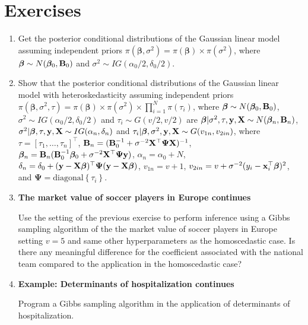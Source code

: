 \section{Exercises}\label{sec612}

\begin{enumerate}
	\item Get the posterior conditional distributions of the Gaussian linear model assuming independent priors $\pi(\bm{\beta},\sigma^2)=\pi(\bm{\beta})\times\pi(\sigma^2)$, where $\bm{\beta} \sim N(\bm{\beta}_0, {\bf{B}}_0)$ and $\sigma^2 \sim IG(\alpha_0/2, \delta_0/2)$.
	
	\item Show that the posterior conditional distributions of the Gaussian linear model with heteroskedasticity assuming independent priors $\pi(\bm{\beta},\sigma^2,\tau)=\pi(\bm{\beta})\times\pi(\sigma^2)\times\prod_{i=1}^N\pi(\tau_i)$, where $\bm{\beta} \sim N(\bm{\beta}_0, {\bf{B}}_0)$, $\sigma^2 \sim IG(\alpha_0/2, \delta_0/2)$ and $\tau_i\sim G(v/2,v/2)$ are $\bm{\beta}|\sigma^2,\tau,{\bf{y}},{\bf{X}}\sim N(\bm{\beta}_n,{\bf{B}}_n)$, $\sigma^2|\bm{\beta},\tau,{\bf{y}},{\bf{X}}\sim IG(\alpha_n,\delta_n)$ and $\tau_i|\bm{\beta},\sigma^2,{\bf{y}},{\bf{X}}\sim G(v_{1n},v_{2in})$, where $\tau=[\tau_1,\dots,\tau_n]^{\top}$, ${\bf{B}}_n=({\bf{B}}_0^{-1}+\sigma^{-2}{\bf{X}}^{\top}\bm{\Psi}{\bf{X}})^{-1}$, $\bm{\beta}_n={\bf{B}}_n({\bf{B}}_0^{-1}\bm{\beta}_0+\sigma^{-2}{\bf{X}}^{\top}\bm{\Psi}{\bf{y}})$, $\alpha_n=\alpha_0+N$, $\delta_n=\delta_0+({\bf{y}}-{\bf{X}}\bm{\beta})^{\top}\bm{\Psi}({\bf{y}}-{\bf{X}}\bm{\beta})$, $v_{1n}=v+1$, $v_{2in}=v+\sigma^{-2}(y_i-{\bf{x}}_i^{\top}\bm{\beta})^2$, and $\bm{\Psi}=\text{diagonal}\left\{\tau_i\right\}$.
	
	\item \textbf{The market value of soccer players in Europe continues}
	
	Use the setting of the previous exercise to perform inference using a Gibbs sampling algorithm of the the market value of soccer players in Europe setting $v=5$ and same other hyperparameters as the homoscedastic case. Is there any meaningful difference for the coefficient associated with the national team compared to the application in the homoscedastic case?
	
	\item \textbf{Example: Determinants of hospitalization continues}
	
	Program a Gibbs sampling algorithm in the application of determinants of hospitalization.
	

\end{enumerate}
